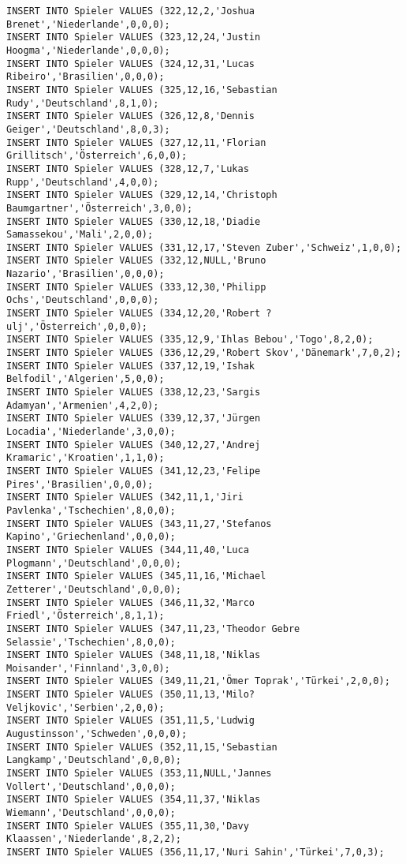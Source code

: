 \documentclass{bschlangaul-aufgabe}
\begin{document}
\begin{verbatim}
INSERT INTO Spieler VALUES (322,12,2,'Joshua Brenet','Niederlande',0,0,0);
INSERT INTO Spieler VALUES (323,12,24,'Justin Hoogma','Niederlande',0,0,0);
INSERT INTO Spieler VALUES (324,12,31,'Lucas Ribeiro','Brasilien',0,0,0);
INSERT INTO Spieler VALUES (325,12,16,'Sebastian Rudy','Deutschland',8,1,0);
INSERT INTO Spieler VALUES (326,12,8,'Dennis Geiger','Deutschland',8,0,3);
INSERT INTO Spieler VALUES (327,12,11,'Florian Grillitsch','Österreich',6,0,0);
INSERT INTO Spieler VALUES (328,12,7,'Lukas Rupp','Deutschland',4,0,0);
INSERT INTO Spieler VALUES (329,12,14,'Christoph Baumgartner','Österreich',3,0,0);
INSERT INTO Spieler VALUES (330,12,18,'Diadie Samassekou','Mali',2,0,0);
INSERT INTO Spieler VALUES (331,12,17,'Steven Zuber','Schweiz',1,0,0);
INSERT INTO Spieler VALUES (332,12,NULL,'Bruno Nazario','Brasilien',0,0,0);
INSERT INTO Spieler VALUES (333,12,30,'Philipp Ochs','Deutschland',0,0,0);
INSERT INTO Spieler VALUES (334,12,20,'Robert ?ulj','Österreich',0,0,0);
INSERT INTO Spieler VALUES (335,12,9,'Ihlas Bebou','Togo',8,2,0);
INSERT INTO Spieler VALUES (336,12,29,'Robert Skov','Dänemark',7,0,2);
INSERT INTO Spieler VALUES (337,12,19,'Ishak Belfodil','Algerien',5,0,0);
INSERT INTO Spieler VALUES (338,12,23,'Sargis Adamyan','Armenien',4,2,0);
INSERT INTO Spieler VALUES (339,12,37,'Jürgen Locadia','Niederlande',3,0,0);
INSERT INTO Spieler VALUES (340,12,27,'Andrej Kramaric','Kroatien',1,1,0);
INSERT INTO Spieler VALUES (341,12,23,'Felipe Pires','Brasilien',0,0,0);
INSERT INTO Spieler VALUES (342,11,1,'Jiri Pavlenka','Tschechien',8,0,0);
INSERT INTO Spieler VALUES (343,11,27,'Stefanos Kapino','Griechenland',0,0,0);
INSERT INTO Spieler VALUES (344,11,40,'Luca Plogmann','Deutschland',0,0,0);
INSERT INTO Spieler VALUES (345,11,16,'Michael Zetterer','Deutschland',0,0,0);
INSERT INTO Spieler VALUES (346,11,32,'Marco Friedl','Österreich',8,1,1);
INSERT INTO Spieler VALUES (347,11,23,'Theodor Gebre Selassie','Tschechien',8,0,0);
INSERT INTO Spieler VALUES (348,11,18,'Niklas Moisander','Finnland',3,0,0);
INSERT INTO Spieler VALUES (349,11,21,'Ömer Toprak','Türkei',2,0,0);
INSERT INTO Spieler VALUES (350,11,13,'Milo? Veljkovic','Serbien',2,0,0);
INSERT INTO Spieler VALUES (351,11,5,'Ludwig Augustinsson','Schweden',0,0,0);
INSERT INTO Spieler VALUES (352,11,15,'Sebastian Langkamp','Deutschland',0,0,0);
INSERT INTO Spieler VALUES (353,11,NULL,'Jannes Vollert','Deutschland',0,0,0);
INSERT INTO Spieler VALUES (354,11,37,'Niklas Wiemann','Deutschland',0,0,0);
INSERT INTO Spieler VALUES (355,11,30,'Davy Klaassen','Niederlande',8,2,2);
INSERT INTO Spieler VALUES (356,11,17,'Nuri Sahin','Türkei',7,0,3);

\end{verbatim}
\end{document}
